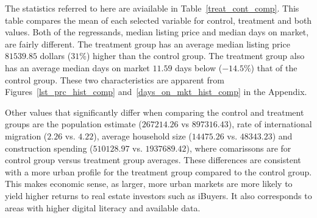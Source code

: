 The statistics referred to here are aviailable in Table~\ref{treat_cont_comp}. This table compares the mean of each selected variable for control, treatment and both values. Both of the regressands, median listing price and median days on market, are fairly different. The treatment group has an average median listing price $81539.85$ dollars ($31\%$) higher than the control group. The treatment group also has an average median days on market $11.59$ days below ($-14.5\%$) that of the control group. These two characteristics are apparent from Figures~\ref{lst_prc_hist_comp} and~\ref{days_on_mkt_hist_comp} in the Appendix. 

Other values that significantly differ when comparing the control and treatment groups are the population estimate ($267214.26$ vs $897316.43$), rate of international migration ($2.26$ vs. $4.22$), average household size ($14475.26$ vs. $48343.23$) and construction spending ($510128.97$ vs. $1937689.42$), where comarissons are for control group versus treatment group averages. These differences are consistent with a more urban profile for the treatment group compared to the control group. This makes economic sense, as larger, more urban markets are more likely to yield higher returns to real estate investors such as iBuyers. It also corresponds to areas with higher digital literacy and available data.
